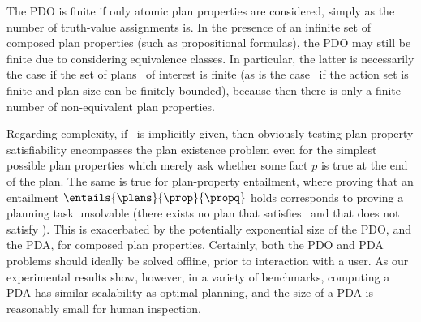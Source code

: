 The PDO is finite if only atomic plan properties are considered,
simply as the number of truth-value assignments is. In the presence of
an infinite set of composed plan properties (such as propositional
formulas), the PDO may still be finite due to considering equivalence
classes. In particular, the latter is necessarily the case if the set
of plans \plans\ of interest is finite (as is the case \eg\ if the
action set is finite and plan size can be finitely bounded), because
then there is only a finite number of non-equivalent plan properties.

Regarding complexity, if \plans\ is implicitly given, then obviously
testing plan-property satisfiability encompasses the plan existence
problem even for the simplest possible plan properties which merely
ask whether some fact $p$ is true at the end of the plan. The same is
true for plan-property entailment, where proving that an entailment
$\entails{\plans}{\prop}{\propq}$ holds corresponds to proving a
planning task unsolvable (there exists no plan that satisfies
\prop\ and that does not satisfy \propq). This is exacerbated by the
potentially exponential size of the PDO, and the PDA, for composed
plan properties. Certainly, both the PDO and PDA problems should
ideally be solved offline, prior to interaction with a user. As our
experimental results show, however, in a variety of benchmarks,
computing a PDA has similar scalability as optimal planning, and the
size of a PDA is reasonably small for human inspection.
%


%
%


